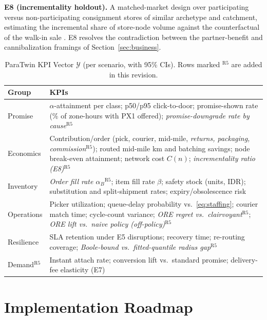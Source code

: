 \documentclass[10pt,twocolumn,letterpaper]{article}
\theoremstyle{definition}
\begin{document}
\textbf{E8 (incrementality holdout).} A matched-market design over participating versus non-participating consignment stores of similar archetype and catchment, estimating the incremental share of store-node volume against the counterfactual of the walk-in sale \cite{imbens2015,abadie2010}. E8 resolves the contradiction between the partner-benefit and cannibalization framings of Section~\ref{sec:business}.

\begin{table}[t]
\caption{ParaTwin KPI Vector $\mathcal{Y}$ (per scenario, with 95\% CIs). Rows marked $^{\mathrm{R5}}$ are added in this revision.}
\label{tab:kpi}
\centering\footnotesize
\begin{tabular}{@{}p{1.3cm}p{6.3cm}@{}}
\toprule
\textbf{Group} & \textbf{KPIs}\\
\midrule
Promise & $\alpha$-attainment per class; p50/p95 click-to-door; promise-shown rate (\% of zone-hours with PX1 offered); \emph{promise-downgrade rate by cause}$^{\mathrm{R5}}$\\
Economics & Contribution/order (pick, courier, mid-mile, \emph{returns, packaging, commission}$^{\mathrm{R5}}$); routed mid-mile km and batching savings; node break-even attainment; network cost $C(n)$; \emph{incrementality ratio (E8)}$^{\mathrm{R5}}$\\
Inventory & \emph{Order fill rate $\alpha_B$}$^{\mathrm{R5}}$; item fill rate $\beta$; safety stock (units, IDR); substitution and split-shipment rates; expiry/obsolescence risk\\
Operations & Picker utilization; queue-delay probability vs.\ \eqref{eq:staffing}; courier match time; cycle-count variance; \emph{ORE regret vs.\ clairvoyant}$^{\mathrm{R5}}$; \emph{ORE lift vs.\ naive policy (off-policy)}$^{\mathrm{R5}}$\\
Resilience & SLA retention under E5 disruptions; recovery time; re-routing coverage; \emph{Boole-bound vs.\ fitted-quantile radius gap}$^{\mathrm{R5}}$\\
Demand$^{\mathrm{R5}}$ & Instant attach rate; conversion lift vs.\ standard promise; delivery-fee elasticity (E7)\\
\bottomrule
\end{tabular}
\end{table}

\section{Implementation Roadmap}\label{sec:roadmap}
\end{document}
